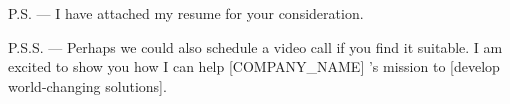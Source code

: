 \documentclass[11pt, a4paper]{awesome-cv}
\begin{document}
\makeletterclosing

P.S. — I have attached my resume for your consideration.

P.S.S. — Perhaps we could also schedule a video call if you find it suitable. I am excited to show you how I can help [COMPANY_NAME] 's mission to [develop world-changing solutions].
\end{document}
